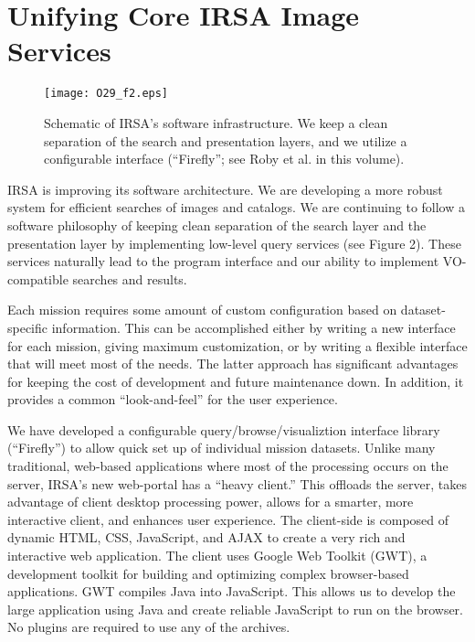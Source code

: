 \documentclass[11pt,twoside]{article}
\begin{document}
\section{Unifying Core IRSA Image Services}

\begin{figure}[t]

\centering
\texttt{[image: O29\_f2.eps]}
\caption{Schematic of IRSA's software infrastructure. We keep a clean 
separation of the search and presentation layers, and we utilize a
configurable interface (``Firefly''; see Roby et al. in this volume).}

\end{figure}

IRSA is improving its software architecture. We are developing a more
robust system for efficient searches of images and catalogs. We are
continuing to follow a software philosophy of keeping clean separation
of the search layer and the presentation layer by implementing
low-level query services (see Figure 2). These services naturally lead to the program
interface and our ability to implement VO-compatible
searches and results.

Each mission requires some amount of custom configuration
based on dataset-specific information.  This can be accomplished
either by writing a new interface for each mission, giving maximum
customization, or by writing a flexible interface that will meet most
of the needs.  The latter approach has significant advantages for
keeping the cost of development and future maintenance down.  In
addition, it provides a common ``look-and-feel'' for the user experience.

We have developed a configurable query/browse/visualiztion interface
library (``Firefly'') to allow quick set up of individual mission
datasets.  Unlike many traditional, web-based applications where most
of the processing occurs on the server, IRSA’s new web-portal has a
“heavy client.” This offloads the server, takes advantage of client
desktop processing power, allows for a smarter, more interactive
client, and enhances user experience. The client-side is composed of
dynamic HTML, CSS, JavaScript, and AJAX to create a very rich and
interactive web application. The client uses Google Web Toolkit (GWT),
a development toolkit for building and optimizing complex
browser-based applications. GWT compiles Java into JavaScript. This
allows us to develop the large application using Java and create
reliable JavaScript to run on the browser. No plugins are required to
use any of the archives.  
\end{document}
